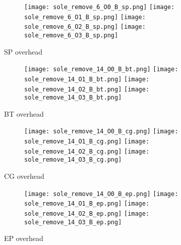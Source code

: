 \documentclass[11pt]{article}
\begin{document}
    \begin{figure}[!ht]
        \begin{subfigure}{\linewidth}
            \texttt{[image: sole\_remove\_6\_O0\_B\_sp.png]}
            \texttt{[image: sole\_remove\_6\_O1\_B\_sp.png]}
            \texttt{[image: sole\_remove\_6\_O2\_B\_sp.png]}
            \texttt{[image: sole\_remove\_6\_O3\_B\_sp.png]}
        \end{subfigure}\par\medskip
        \caption{SP overhead}
    \end{figure}

    \newpage


    \begin{figure}[!ht]
        \begin{subfigure}{\linewidth}
            \texttt{[image: sole\_remove\_14\_O0\_B\_bt.png]}\hfill
            \texttt{[image: sole\_remove\_14\_O1\_B\_bt.png]}\hfill
            \texttt{[image: sole\_remove\_14\_O2\_B\_bt.png]}\hfill
            \texttt{[image: sole\_remove\_14\_O3\_B\_bt.png]}\hfill
        \end{subfigure}\par\medskip
        \caption{BT overhead}\label{fig:figure}
    \end{figure}

    \begin{figure}[!ht]
        \begin{subfigure}{\linewidth}
            \texttt{[image: sole\_remove\_14\_O0\_B\_cg.png]}\hfill
            \texttt{[image: sole\_remove\_14\_O1\_B\_cg.png]}\hfill
            \texttt{[image: sole\_remove\_14\_O2\_B\_cg.png]}\hfill
            \texttt{[image: sole\_remove\_14\_O3\_B\_cg.png]}\hfill
        \end{subfigure}\par\medskip
        \caption{CG overhead}\label{fig:figure2}
    \end{figure}
\begin{figure}[!ht]
        \begin{subfigure}{\linewidth}
            \texttt{[image: sole\_remove\_14\_O0\_B\_ep.png]}\hfill
            \texttt{[image: sole\_remove\_14\_O1\_B\_ep.png]}\hfill
            \texttt{[image: sole\_remove\_14\_O2\_B\_ep.png]}\hfill
            \texttt{[image: sole\_remove\_14\_O3\_B\_ep.png]}\hfill
        \end{subfigure}\par\medskip
        \caption{EP overhead}\label{fig:figure3}
\end{figure}
\end{document}
